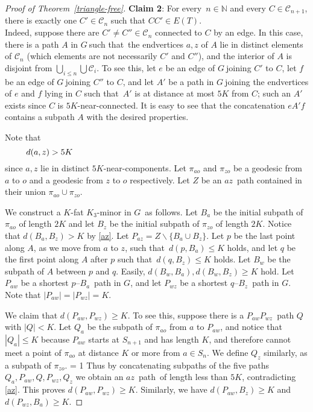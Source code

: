 \documentclass[a4paper]{article}
\newcommand{\Debug}{0}
\newcommand{\N}{\ensuremath{\mathbb N}}
\newcommand{\cc}{\ensuremath{\mathcal C}}
\newcommand{\sm}{\backslash}
\newcommand{\nin}{\ensuremath{{n\in\N}}}
\newcommand{\pth}[2]{\ensuremath{#1}\text{--}\ensuremath{#2}~path}
\newcommand{\g}{\ensuremath{G\ }}
\newcommand{\G}{\ensuremath{G}}
\newcommand{\Tr}[1]{Theorem~\ref{#1}}
\newcommand{\Fe}{For every}
\newcommand{\st}{such that}
\newcommand{\labtequ}[2]{\begin{equation} \label{#1} 	\begin{minipage}[c]{0.9\textwidth}  #2 \end{minipage} \ignorespacesafterend \end{equation} }
\newcommand{\mymargin}[1]{\ifnum \Debug = 1
  \marginpar{\begin{minipage}{\marginparwidth}\small \begin{flushleft}{\color{blue}#1}\end{flushleft}\end{minipage}}\fi
}
\begin{document}
\begin{proof}[Proof of \Tr{triangle-free}]
{\bf Claim 2}: \Fe\ $\nin$ and every $C\in \cc_{n+1}$, there is exactly one $C'\in \cc_n$ such that $CC' \in E(T)$. \\ 


Indeed, suppose there are $C'\neq C''\in \cc_n$ connected to $C$ by an edge. In this case, there is a path $A$ in \g \st\  the endvertices $a,z$ of $A$ lie in distinct elements of $\cc_n$ (which elements are not necessarily $C'$ and $C''$), and the interior of $A$ is disjoint from $\bigcup_{i\leq n} \bigcup \cc_i$. To see this, let $e$ be an edge of \g joining $C'$ to $C$, let $f$ be an edge of \g joining $C''$ to $C$, and let $A'$ be a path in \g joining the endvertices of $e$ and $f$ lying in $C$ \st\ $A'$ is at distance at most $5K$ from $C$; such an $A'$ exists since $C$ is $5K$-near-connected. It is easy to see that the concatenation $e A' f$ contains a subpath $A$ with the desired properties.

Note that 
\labtequ{az}{$d(a,z)>5K$}
since $a,z$ lie in distinct $5K$-near-components. Let $\pi_{a o}$ and $\pi_{z o}$ be a geodesic from $a$ to $o$  and a geodesic from $z$ to $o$ respectively.  Let $Z$ be an \pth{a}{z} contained in their union $\pi_{a o} \cup \pi_{z o}$.

We construct a $K$-fat $K_3$-minor in \G\ as follows.
Let $B_a$ be the initial subpath of $\pi_{a o}$ of length $2K$ and let $B_z$ be the initial subpath of $\pi_{z o}$ of length $2K$. Notice that $d(B_a,B_z) > K$ by \eqref{az}. Let $P_{az}= Z \sm \{B_a \cup B_z\}$. Let $p$ be the last point along $A$, as we move from $a$ to $z$, \st\ $d(p,B_a)\leq K$ holds, and let $q$ be the first point along $A$ after $p$ \st\ $d(q,B_z)\leq K$ holds. Let $B_w$ be the subpath of $A$ between $p$ and $q$. Easily, $d(B_w,B_a), d(B_w,B_z)\geq K$ hold. Let $P_{aw}$ be a shortest $p$--$B_a$~path in $G$, and let $P_{wz}$ be a shortest $q$--$B_z$~path in $G$. Note that $|P_{aw}|=|P_{wz}|=K$. 

We claim that $d(P_{aw},P_{wz}) \geq K$. To see this, suppose there is a \pth{P_{aw}}{P_{wz}} $Q$ with $|Q|<K$. Let $Q_a$ be the subpath of $\pi_{a o}$ from $a$ to $P_{aw}$, and notice that $|Q_a|\leq K$ because $P_{aw}$ starts at $S_{n+1}$ and has length $K$, and therefore cannot meet a point of $\pi_{a o}$ at distance $K$ or more  from $a\in S_n$. We define $Q_z$ similarly, as a subpath of $\pi_{z o}$. \mymargin{This paragraph has been rewritten.} Thus by concatenating subpaths of the five paths $Q_a, P_{aw}, Q, P_{wz}, Q_z$ we obtain an \pth{a}{z}\ of length less than $5K$, contradicting \eqref{az}. This proves $d(P_{aw},P_{wz}) \geq K$. Similarly, we have $d(P_{aw},B_z)\geq K$ and $d(P_{wz},B_a)\geq  K$. 







\end{proof}
\end{document}
